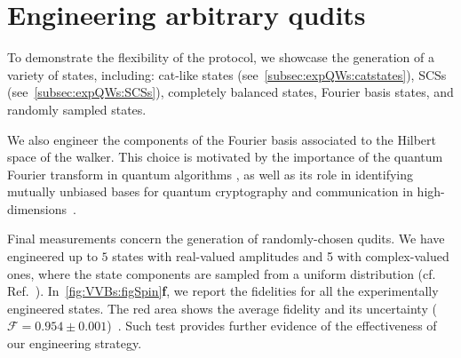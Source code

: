 \section{Engineering arbitrary qudits}
\label{sec:expQWs:arbitrary_qudits}

To demonstrate the flexibility of the protocol, we showcase the generation of a variety of states, including: cat-like states (see~\cref{subsec:expQWs:catstates}), \acp{SCS} (see~\cref{subsec:expQWs:SCSs}), completely balanced states, Fourier basis states, and randomly sampled states.

We also engineer the components of the Fourier basis associated to the Hilbert space of the walker. This choice is motivated by the importance of the quantum Fourier transform in quantum algorithms \cite{nielsen2002quantum}, as well as its role in identifying mutually unbiased bases for quantum cryptography and communication in high-dimensions~\cite{durt2010mutually,bandyopadhyay2002new,brierley2009constructing,dambrosio2013test}.

Final measurements concern the generation of randomly-chosen qudits. We have engineered up to $5$ states with real-valued amplitudes and 5 with complex-valued ones, where the state components are sampled from a uniform distribution (cf. Ref.~\cite{SI}).
In~\cref{fig:VVBs:figSpin}\textbf{f}, we report the fidelities for all the experimentally engineered states.
The red area shows the average fidelity and its uncertainty ($\mathcal{F}{=}0.954 \pm 0.001$)~\cite{SI}. Such test provides further evidence of the effectiveness of our engineering strategy.


